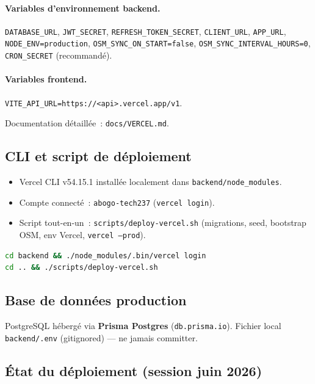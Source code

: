 \documentclass[11pt,a4paper]{article}
\begin{document}
\paragraph{Variables d'environnement backend.}
\texttt{DATABASE\_URL}, \texttt{JWT\_SECRET}, \texttt{REFRESH\_TOKEN\_SECRET},
\texttt{CLIENT\_URL}, \texttt{APP\_URL}, \texttt{NODE\_ENV=production},
\texttt{OSM\_SYNC\_ON\_START=false}, \texttt{OSM\_SYNC\_INTERVAL\_HOURS=0},
\texttt{CRON\_SECRET} (recommandé).

\paragraph{Variables frontend.}
\texttt{VITE\_API\_URL=https://<api>.vercel.app/v1}.

Documentation détaillée~: \texttt{docs/VERCEL.md}.

\subsection{CLI et script de déploiement}

\begin{itemize}
  \item Vercel CLI v54.15.1 installée localement dans \texttt{backend/node\_modules}.
  \item Compte connecté~: \texttt{abogo-tech237} (\texttt{vercel login}).
  \item Script tout-en-un~: \texttt{scripts/deploy-vercel.sh}
        (migrations, seed, bootstrap OSM, env Vercel, \texttt{vercel --prod}).
\end{itemize}

\begin{lstlisting}[language=bash]
cd backend && ./node_modules/.bin/vercel login
cd .. && ./scripts/deploy-vercel.sh
\end{lstlisting}

\subsection{Base de données production}

PostgreSQL hébergé via \textbf{Prisma Postgres} (\texttt{db.prisma.io}).
Fichier local \texttt{backend/.env} (gitignored) --- ne jamais committer.

\subsection{État du déploiement (session juin 2026)}
\end{document}
